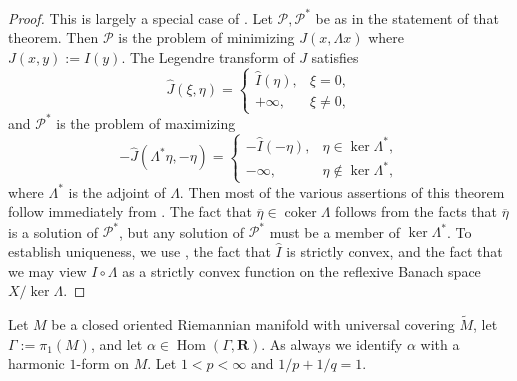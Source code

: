 \documentclass[reqno,11pt]{amsart}
\newcommand{\RR}{\mathbf{R}}
\DeclareMathOperator{\Hom}{Hom}
\DeclareMathOperator{\coker}{coker}
\theoremstyle{definition}
\numberwithin{equation}{section}
\begin{document}
\begin{proof}
This is largely a special case of \cite[Chapter IV, Theorem 4.2]{Ekeland99}.
Let $\mathscr P, \mathscr P^*$ be as in the statement of that theorem.
Then $\mathscr P$ is the problem of minimizing $J(x, \Lambda x)$ where $J(x, y) := I(y)$.
The Legendre transform of $J$ satisfies 
$$\hat J(\xi, \eta) = \begin{cases} \hat I(\eta), & \xi = 0, \\
	+\infty, &\xi \neq 0,
\end{cases}$$
and $\mathscr P^*$ is the problem of maximizing
$$-\hat J(\Lambda^* \eta, -\eta) = \begin{cases}
	-\hat I(-\eta), &\eta \in \ker \Lambda^*, \\
	-\infty, &\eta \notin \ker \Lambda^*,
\end{cases}$$
where $\Lambda^*$ is the adjoint of $\Lambda$.
Then most of the various assertions of this theorem follow immediately from \cite[Chapter IV, Theorem 4.2]{Ekeland99}.
The fact that $\overline \eta \in \coker \Lambda$ follows from the facts that $\overline \eta$ is a solution of $\mathscr P^*$, but any solution of $\mathscr P^*$ must be a member of $\ker \Lambda^*$. 
To establish uniqueness, we use \cite[Chapter II, Proposition 1.2]{Ekeland99}, the fact that $\hat I$ is strictly convex, and the fact that we may view $I \circ \Lambda$ as a strictly convex function on the reflexive Banach space $X/\ker \Lambda$.
\end{proof}

Let $M$ be a closed oriented Riemannian manifold with universal covering $\tilde M$, let $\Gamma := \pi_1(M)$, and let $\alpha \in \Hom(\Gamma, \RR)$.
As always we identify $\alpha$ with a harmonic $1$-form on $M$.
Let $1 < p < \infty$ and $1/p + 1/q = 1$.
\end{document}
